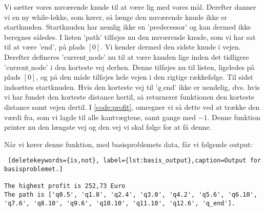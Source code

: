 Vi sætter vores nuværende knude til at være lig med vores mål.
Derefter danner vi en ny while-løkke, som kører, så længe den nuværende knude ikke er startknuden. Startknuden har nemlig ikke en 'predecessor' og kan dermed ikke beregnes således. I listen 'path' tilføjes nu den nuværende knude, som vi har sat til at være 'end', på plads $[0]$. Vi kender dermed den sidste knude i vejen. Derefter defineres 'current$\_$node' nu til at være knuden lige inden det tidligere 'current$\_$node' i den korteste vej derhen. Denne tilføjes nu til listen, ligeledes på plads $[0]$, og på den måde tilføjes hele vejen i den rigtige rækkefølge. Til sidst indsættes startknuden.
Hvis den korteste vej til '$q\_$end' ikke er uendelig, dvs. hvis vi har fundet den korteste distance hertil, så returnerer funktionen den korteste distance samt vejen dertil.
I \autoref{code:profit}, omregner vi så dette ved at trække den værdi fra, som vi lagde til alle kantvægtene, samt gange med $-1$. Denne funktion printer nu den længste vej og den vej vi skal følge for at få denne. 

 

Når vi kører denne funktion, med basisproblemets data, får vi følgende output:

\begin{lstlisting} [deletekeywords={is,not}, label={lst:basis_output},caption=Output for basisproblemet.]

The highest profit is 252,73 Euro
The path is ['q0.5', 'q1.8', 'q2.4', 'q3.0', 'q4.2', 'q5.6', 'q6.10', 'q7.6', 'q8.10', 'q9.6', 'q10.10', 'q11.10', 'q12.6', 'q_end'].

\end{lstlisting}
